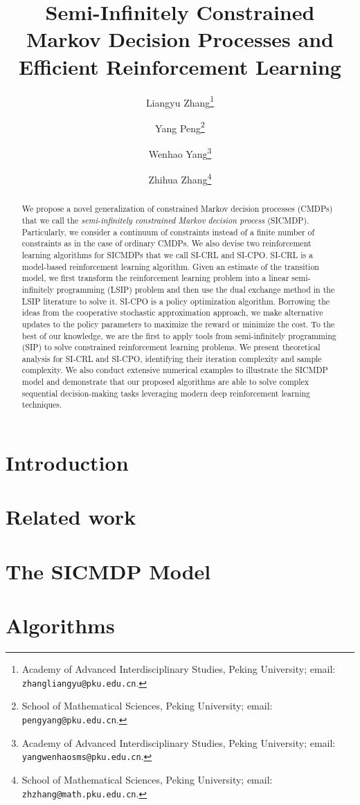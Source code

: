 \documentclass[11pt]{article}
\title{Semi-Infinitely Constrained Markov Decision Processes and Efficient Reinforcement Learning}
\author{Liangyu Zhang\thanks{Academy of Advanced Interdisciplinary Studies, Peking University; email: \texttt{zhangliangyu@pku.edu.cn}.} 
\and
Yang Peng\thanks{School of Mathematical Sciences, Peking University; email: \texttt{pengyang@pku.edu.cn}.}
\and
Wenhao Yang\thanks{Academy of Advanced Interdisciplinary Studies, Peking University; email: \texttt{yangwenhaosms@pku.edu.cn}.}
\and
Zhihua Zhang\thanks{School of Mathematical Sciences, Peking University; email: \texttt{zhzhang@math.pku.edu.cn}.}
}
\theoremstyle{definition}
\theoremstyle{remark}
\begin{document}
\maketitle

\begin{abstract}
  We propose a novel generalization of constrained Markov decision processes (CMDPs) that we call the \emph{semi-infinitely constrained Markov decision process} (SICMDP).
Particularly, %
we consider a continuum of constraints instead of a finite number of constraints as in the case of ordinary CMDPs.
We also devise two reinforcement learning algorithms
for SICMDPs that we call SI-CRL and SI-CPO.
SI-CRL is a model-based reinforcement learning algorithm.
Given an estimate of the transition model, we first transform the reinforcement learning problem into a linear semi-infinitely programming (LSIP) problem and then use the dual exchange method in the LSIP literature to solve it.
SI-CPO is a policy optimization algorithm.
Borrowing the ideas from the cooperative stochastic approximation approach, we make alternative updates to the policy parameters to maximize the reward or minimize the cost.
To the best of our knowledge, we are the first to apply tools from semi-infinitely programming (SIP) to solve constrained reinforcement learning problems.
We present theoretical analysis for SI-CRL and SI-CPO, identifying their iteration complexity and sample complexity.
We also conduct extensive numerical examples to illustrate the SICMDP model and demonstrate that our proposed algorithms are able to solve complex sequential decision-making tasks leveraging modern deep reinforcement learning techniques.
\end{abstract}

\section{Introduction}

\section{Related work}

\section{The SICMDP Model}

\section{Algorithms}


\end{document}
